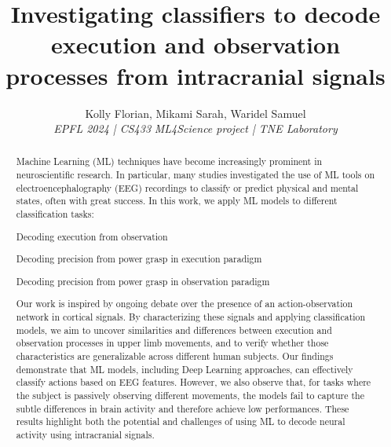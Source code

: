 \documentclass[10pt,conference,compsocconf]{IEEEtran}
\begin{document}
\title{Investigating classifiers to decode execution and observation processes from intracranial signals}

\author{
  Kolly Florian, Mikami Sarah, Waridel Samuel \\
  \textit{EPFL 2024 | CS433}
  \textit{ML4Science project | TNE Laboratory}
}

\maketitle

\begin{abstract}
    Machine Learning (ML) techniques have become increasingly prominent in neuroscientific research. In particular, many studies investigated the use of ML tools on electroencephalography (EEG) recordings to classify or predict physical and mental states, often with great success. In this work, we apply ML models to different classification tasks:
    \begin{mylist}
        \item Decoding execution from observation
        \item Decoding precision from power grasp in execution paradigm
        \item Decoding precision from power grasp in observation paradigm
    \end{mylist}
    Our work is inspired by ongoing debate over the presence of an action-observation network in cortical signals. By characterizing these signals and applying classification models, we aim to uncover similarities and differences between execution and observation processes in upper limb movements, and to verify whether those characteristics are generalizable across different human subjects. Our findings demonstrate that ML models, including Deep Learning approaches, can effectively classify actions based on EEG features. However, we also observe that, for tasks where the subject is passively observing different movements, the models fail to capture the subtle differences in brain activity and therefore achieve low performances. These results highlight both the potential and challenges of using ML to decode neural activity using intracranial signals.

\end{abstract}
\end{document}
